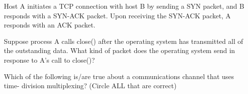 \documentclass[answers,addpoints]{exam}
\begin{document}
\begin{questions}
\question
Host A initiates a TCP connection with host B by sending a SYN packet, and B responds with a SYN-ACK packet. Upon receiving the SYN-ACK packet, A responds with an ACK packet. 


\question
Suppose process A calls close() after the operating system has transmitted all of the outstanding data. What kind of packet does the operating system send in response to A’s call to close()? 
 \fillwithdottedlines{0.5in}
 


\question
Which of the following is/are true about a communications channel that uses time- division multiplexing? (Circle ALL that are correct)


\end{questions}
\end{document}
